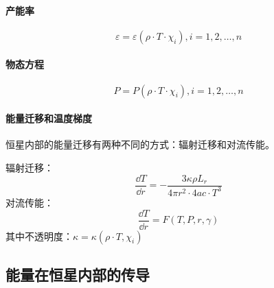 \paragraph{产能率}
\begin{equation}
	\varepsilon=\varepsilon(\rho\cdot T\cdot \chi_{i}),i=1,2,\dots,n
\end{equation}
\paragraph{物态方程}
\begin{equation}
	P=P(\rho\cdot T\cdot \chi_{i}),i=1,2,\dots,n
\end{equation}
\paragraph{能量迁移和温度梯度}
恒星内部的能量迁移有两种不同的方式：辐射迁移和对流传能。

辐射迁移：
\begin{equation}
	\frac{\dd T}{\dd r}=-\frac{3\kappa\rho L_{r}}{4\pi r^2\cdot4ac\cdot T^3}
\end{equation}
对流传能：
\begin{equation}
	\frac{\dd T}{\dd r}=F(T,P,r,\gamma)
\end{equation}
其中不透明度：$\kappa=\kappa(\rho\cdot T,\chi_{i})$
\subsection{能量在恒星内部的传导}
